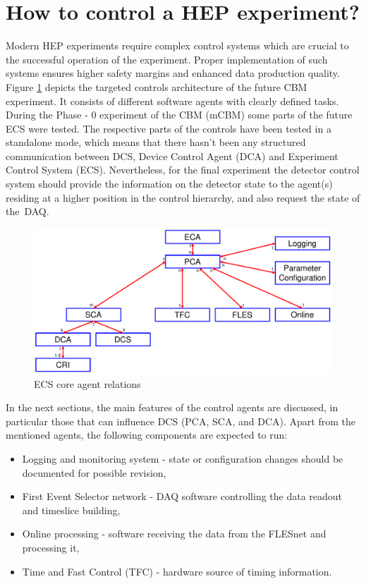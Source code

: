 \section{How to control a HEP experiment?}
Modern \gls{HEP} experiments require complex control systems which are crucial to the successful operation of the experiment. Proper implementation of such systems ensures higher safety margins and enhanced data production quality. 
Figure \ref{fig_sim} depicts the targeted controls architecture of the future \gls{CBM} experiment. It consists of different software agents with clearly defined tasks. During the Phase - 0 experiment of the \gls{CBM} (\gls{mCBM}) some parts of the future \gls{ECS} were tested. The respective parts of the controls have been tested in a standalone mode, which means that there hasn't been any structured communication between \gls{DCS}, Device Control Agent (\gls{DCA}) and Experiment Control System (\gls{ECS}). Nevertheless, for the final experiment the detector control system should provide the information on the detector state to the agent(s) residing at a higher position in the control hierarchy, and also request the state of the~\gls{DAQ}.
\begin{figure}[!h]
\centering
\includegraphics[width=0.8\columnwidth]{Chapter3/Controls/images/AgentsRelations_V2.pdf}
\caption{\gls{ECS} core agent relations}
\label{fig_sim}
\end{figure}
 In the next sections, the main features of the control agents are discussed, in particular those that can influence \gls{DCS} (\gls{PCA}, \gls{SCA}, and \gls{DCA}). Apart from the mentioned agents, the following components are expected to run: 
 \begin{itemize}
     \item Logging and monitoring system - state or configuration changes should be documented for possible revision,
     \item First Event Selector network - \gls{DAQ} software controlling the data readout and timeslice building,
     \item Online processing - software receiving the data from the FLESnet and processing it,
     \item Time and Fast Control (\gls{TFC}) - hardware source of timing information.
 \end{itemize}
